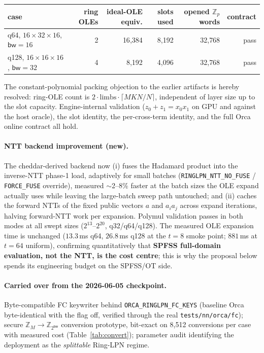 \documentclass[11pt]{article}
\newcommand{\Z}{\mathbb{Z}}
\newcommand{\modtwo}{\Z_{2^{\mathsf{bw}}}}
\newcommand{\bw}{\mathsf{bw}}
\begin{document}
\begin{center}
\begin{tabular}{lrrrrr}
\toprule
case & ring OLEs & ideal-OLE equiv. & slots used & opened $\Z_p$ words & contract \\
\midrule
q64, $16{\times}32{\times}16$, $\bw{=}16$ & 2 & 16{,}384 & 8{,}192 & 32{,}768 & pass \\
q128, $16{\times}16{\times}16$, $\bw{=}32$ & 4 & 8{,}192 & 4{,}096 & 32{,}768 & pass \\
\bottomrule
\end{tabular}
\end{center}

The constant-polynomial packing objection to the earlier artifacts is hereby
resolved: ring-OLE count is $2\cdot\mathrm{limbs}\cdot\lceil MKN/N \rceil$,
independent of layer size up to the slot capacity. Engine-internal validation
($z_0{+}z_1 = x_0 x_1$ on GPU and against the host oracle), the slot identity,
the per-cross-term identity, and the full Orca online contract all hold.

\paragraph{NTT backend improvement (new).}
The cheddar-derived backend now (i) fuses the Hadamard product into the
inverse-NTT phase-1 load, adaptively for small batches
(\texttt{RINGLPN\_NTT\_NO\_FUSE} / \texttt{FORCE\_FUSE} override), measured
$\sim$2--8\% faster at the batch sizes the OLE expand actually uses while
leaving the large-batch sweep path untouched; and (ii) caches the forward NTTs
of the fixed public vectors $a$ and $a_i a_j$ across expand iterations,
halving forward-NTT work per expansion. Polymul validation passes in both
modes at all swept sizes ($2^{13}$--$2^{20}$, q32/q64/q128). The measured OLE
expansion time is unchanged ($13.3$\,ms q64, $26.8$\,ms q128 at the $t{=}8$
smoke point; $881$\,ms at $t{=}64$ uniform), confirming quantitatively that
\textbf{SPFSS full-domain evaluation, not the NTT, is the cost centre}; this
is why the proposal below spends its engineering budget on the SPFSS/OT side.

\paragraph{Carried over from the 2026-06-05 checkpoint.}
Byte-compatible FC keywriter behind \texttt{ORCA\_RINGLPN\_FC\_KEYS} (baseline
Orca byte-identical with the flag off, verified through the real
\texttt{tests/nn/orca/fc}); secure $\Z_M \to \modtwo$ conversion prototype,
bit-exact on 8{,}512 conversions per case with measured cost
(Table~\ref{tab:convert}); parameter audit identifying the deployment as the
\emph{splittable} Ring-LPN regime.
\end{document}
